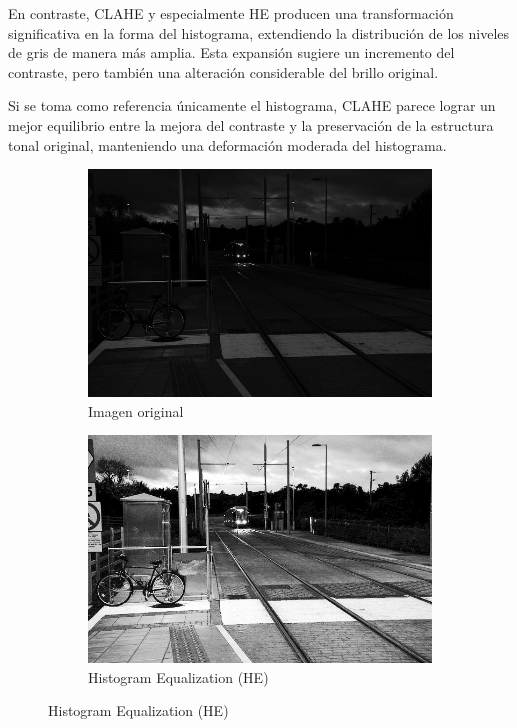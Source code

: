 \documentclass[sigchi]{acmart}
\begin{document}
En contraste, CLAHE y especialmente HE producen una transformación significativa en la forma
del histograma, extendiendo la distribución de los niveles de gris de manera más amplia. Esta
expansión sugiere un incremento del contraste, pero también una alteración considerable del
brillo original.

Si se toma como referencia únicamente el histograma, CLAHE parece lograr un mejor equilibrio
entre la mejora del contraste y la preservación de la estructura tonal original, manteniendo
una deformación moderada del histograma.

\begin{figure}[htbp]
	\centering

	\begin{subfigure}[b]{0.32\textwidth}
		\centering
		\includegraphics[width=\linewidth]{./procesadas/2015_00026/2015_00026_original.png}
		\caption{Imagen original}
	\end{subfigure}
	\hfill
	\begin{subfigure}[b]{0.32\textwidth}
		\centering
		\includegraphics[width=\linewidth]{./procesadas/2015_00026/2015_00026_he.png}
		\caption{Histogram Equalization (HE)}
	\end{subfigure}


\end{figure}
\end{document}

